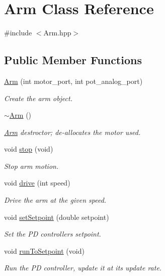 \hypertarget{class_arm}{}\section{Arm Class Reference}
\label{class_arm}


{\ttfamily \#include $<$Arm.\+hpp$>$}

\subsection*{Public Member Functions}
\begin{DoxyCompactItemize}
\item 
\hyperlink{class_arm_a907bca91f60b7f75b13e76cb4cea0577}{Arm} (int motor\+\_\+port, int pot\+\_\+analog\+\_\+port)
\begin{DoxyCompactList}\small\item\em Create the arm object. \end{DoxyCompactList}\item 
\hyperlink{class_arm_ae1bcf12831b42e93d431efe3b7910b5e}{$\sim$\+Arm} ()
\begin{DoxyCompactList}\small\item\em \hyperlink{class_arm}{Arm} destroctor; de-\/allocates the motor used. \end{DoxyCompactList}\item 
void \hyperlink{class_arm_a4a2070a27aecb7129cb89f4c9231278a}{stop} (void)
\begin{DoxyCompactList}\small\item\em Stop arm motion. \end{DoxyCompactList}\item 
void \hyperlink{class_arm_a50abf82c871d15bbbfd669b4f33a0d60}{drive} (int speed)
\begin{DoxyCompactList}\small\item\em Drive the arm at the given speed. \end{DoxyCompactList}\item 
void \hyperlink{class_arm_a331502c3508a7d8137d9405f050ecbbf}{set\+Setpoint} (double setpoint)
\begin{DoxyCompactList}\small\item\em Set the PD controller\textquotesingle{}s setpoint. \end{DoxyCompactList}\item 
void \hyperlink{class_arm_a8cd24cca4215a944bd47df13e252e8a0}{run\+To\+Setpoint} (void)
\begin{DoxyCompactList}\small\item\em Run the PD controller, update it at its update rate. \end{DoxyCompactList}\item 

\end{DoxyCompactItemize}
